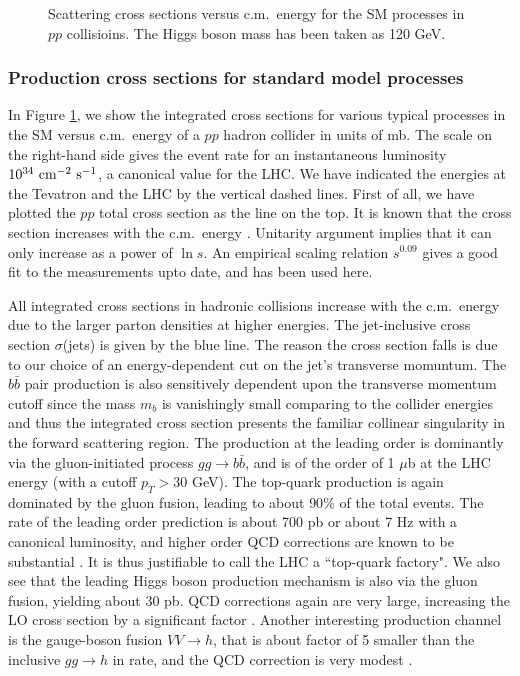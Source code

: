 \documentclass[12pt,prd,aps,floats,preprintnumbers,preprint,superscriptaddress,floatfix,nofootinbib]{revtex4}
\begin{document}
\begin{center}
\begin{figure}[tb]
\caption{Scattering cross sections versus c.m.~energy
for the SM processes in $pp$ collisioins. 
 The Higgs boson mass has been taken as 120 GeV.}
\label{fig:hadron}
\end{figure}
\end{center}

\subsubsection{Production cross sections for standard model processes} 
In Figure \ref{fig:hadron}, we show the integrated cross sections for various typical 
processes in the SM versus c.m.~energy of a $pp$ hadron collider in units of mb.  
The scale on the right-hand side gives the event rate for an instantaneous luminosity
$10^{34}\ {\rm cm}^{-2}\ {\rm s}^{-1}$, a canonical value for the LHC.
We have indicated the energies at the Tevatron 
and the LHC by the vertical dashed lines. 
First of all, we have plotted the $pp$ total cross section as the line on 
the top. It is known that the cross section increases with the 
c.m.~energy \cite{ttwu}.
Unitarity argument implies that it can only increase as a power of $\ln s$. 
An empirical scaling relation $s^{0.09}$ gives a good fit to the 
measurements upto date, and has been used here. 

All integrated cross sections in hadronic collisions increase with the 
c.m.~energy due to the larger parton densities at higher energies. 
The jet-inclusive cross section $\sigma$(jets) is given by the blue line.
The reason the cross section falls is due to our choice of an
energy-dependent cut on the jet's transverse momuntum. 
The $b\bar b$ pair production is also
sensitively dependent upon the transverse momentum cutoff since the
mass $m_b$ is vanishingly small comparing to the collider energies
and thus the integrated cross section presents the familiar collinear 
singularity in the forward scattering region. 
The production at the leading order is dominantly via the gluon-initiated
process $gg\to b \bar b$, and is of the order of 1 $\mu$b at the LHC
energy (with a cutoff $p_T>30$ GeV). The top-quark production is
again dominated by the gluon fusion, leading to about $90\%$ of the
total events. The rate of the leading order prediction 
is about 700 pb or about 7 Hz with a canonical luminosity, and
higher order QCD corrections are known to be substantial \cite{top}.
It is thus justifiable to call the LHC a ``top-quark factory".
We also see that the leading Higgs boson production mechanism 
is also via the gluon fusion, yielding about 30 pb. QCD corrections
again are very large, increasing the LO cross section by a significant
factor \cite{ggh}. Another interesting
production channel is the gauge-boson fusion $VV\to h$, that is
about factor of 5 smaller than the inclusive $gg\to h$ in rate,
and the QCD correction is very modest \cite{vvh}. 
\end{document}

